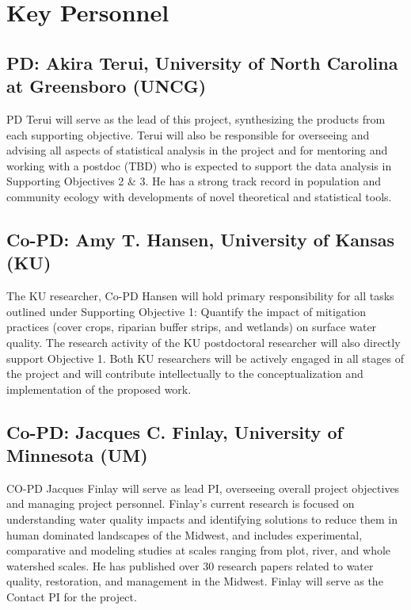 \documentclass[12pt, class=article, crop=false]{standalone}
\begin{document}
\section*{Key Personnel}

\subsection*{PD: Akira Terui, University of North Carolina at Greensboro (UNCG)}
PD Terui will serve as the lead of this project, synthesizing the products from each supporting objective.
Terui will also be responsible for overseeing and advising all aspects of statistical analysis in the project and for mentoring and working with a postdoc (TBD) who is expected to support the data analysis in Supporting Objectives 2 \& 3.
He has a strong track record in population and community ecology with developments of novel theoretical and statistical tools.

\subsection*{Co-PD: Amy T. Hansen, University of Kansas (KU)}
The KU researcher, Co-PD Hansen will hold primary responsibility for all tasks outlined under Supporting Objective 1: Quantify the impact of mitigation practices (cover crops, riparian buffer strips, and wetlands) on surface water quality.
The research activity of the KU postdoctoral researcher will also directly support Objective 1.
Both KU researchers will be actively engaged in all stages of the project and will contribute intellectually to the conceptualization and implementation of the proposed work.

\subsection*{Co-PD: Jacques C. Finlay, University of Minnesota (UM)}
CO-PD Jacques Finlay will serve as lead PI, overseeing overall project objectives and managing project personnel.
Finlay’s current research is focused on understanding water quality impacts and identifying solutions to reduce them in human dominated landscapes of the Midwest, and includes experimental, comparative and modeling studies at scales ranging from plot, river, and whole watershed scales.
He has published over 30 research papers related to water quality, restoration, and management in the Midwest.
Finlay will serve as the Contact PI for the project.
\end{document}
